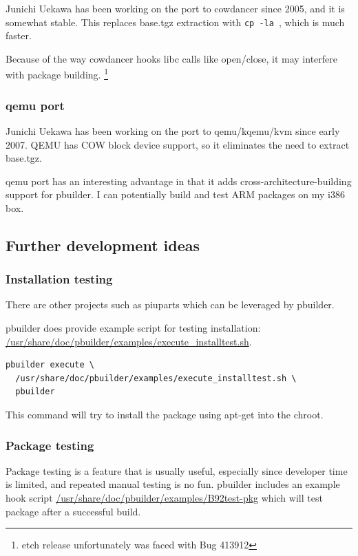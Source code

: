 \documentclass[a4paper]{article}
\begin{document}
Junichi Uekawa has been working on the port to cowdancer since 2005, and
it is somewhat stable.  This replaces base.tgz extraction with
\texttt{cp -la }, which is much faster.

Because of the way cowdancer hooks libc calls like open/close, it may
interfere with package building.  \footnote{etch release unfortunately
was faced with Bug 413912}

\subsubsection{qemu port}

Junichi Uekawa has been working on the port to qemu/kqemu/kvm since
early 2007. QEMU has COW block device support, so it eliminates the need
to extract base.tgz.

qemu port has an interesting advantage in that it adds
cross-architecture-building support for pbuilder. I can potentially
build and test ARM packages on my i386 box.

\subsection{Further development ideas}

\subsubsection{Installation testing}

There are other projects such as piuparts which can be leveraged by
pbuilder.  

pbuilder does provide example script for testing installation:
\url{/usr/share/doc/pbuilder/examples/execute_installtest.sh}.

\begin{verbatim}
pbuilder execute \
  /usr/share/doc/pbuilder/examples/execute_installtest.sh \
  pbuilder
\end{verbatim}

This command will try to install the package using apt-get into the
chroot.

\subsubsection{Package testing}

Package testing is a feature that is usually useful, especially since
developer time is limited, and repeated manual testing is no fun.
pbuilder includes an example hook script
\url{/usr/share/doc/pbuilder/examples/B92test-pkg} which will test
package after a successful build.
\end{document}
